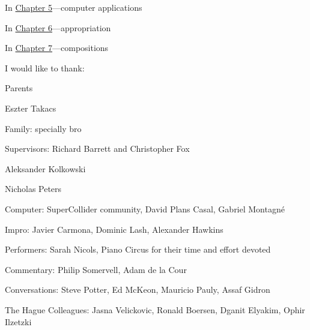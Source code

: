 In \hyperlink{chapter5}{Chapter 5}---computer applications

In \hyperlink{chapter6}{Chapter 6}---appropriation

In \hyperlink{chapter7}{Chapter 7}---compositions

I would like to thank:

Parents 

Eszter Takacs

Family: specially bro

Supervisors: Richard Barrett and Christopher Fox

Aleksander Kolkowski

Nicholas Peters

Computer: SuperCollider community, David Plans Casal, Gabriel Montagn\'e

Impro: Javier Carmona, Dominic Lash, Alexander Hawkins

Performers: Sarah Nicols, Piano Circus for their time and effort devoted

Commentary: Philip Somervell, Adam de la Cour

Conversations: Steve Potter, Ed McKeon, Mauricio Pauly, Assaf Gidron

The Hague Colleagues: Jasna Velickovic, Ronald Boersen, Dganit Elyakim, Ophir Ilzetzki

\label{ch:preface}

